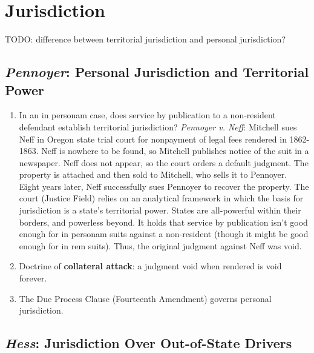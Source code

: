 \section{Jurisdiction}

TODO: difference between territorial jurisdiction and personal jurisdiction?

\subsection{\emph{Pennoyer}: Personal Jurisdiction and Territorial Power}

\begin{enumerate}
    \item  In an in personam case, does service by publication to a non-resident defendant establish territorial jurisdiction? \emph{Pennoyer v. Neff}:
Mitchell sues Neff in Oregon state trial court for nonpayment of legal fees rendered in 1862-1863. Neff is nowhere to be found, so Mitchell publishes notice of the suit in a newspaper. Neff does not appear, so the court orders a default judgment. The property is attached and then sold to Mitchell, who sells it to Pennoyer. Eight years later, Neff successfully sues Pennoyer to recover the property. The court (Justice Field) relies on an analytical framework in which the basis for jurisdiction is a state's territorial power. States are all-powerful within their borders, and powerless beyond. It holds that service by publication isn't good enough for in personam suits against a non-resident (though it might be good enough for in rem suits). Thus, the original judgment against Neff was void.
    \item Doctrine of \textbf{collateral attack}: a judgment void when rendered is void forever.
    \item The Due Process Clause (Fourteenth Amendment) governs personal jurisdiction.
\end{enumerate}

\subsection{\emph{Hess}: Jurisdiction Over Out-of-State Drivers}

